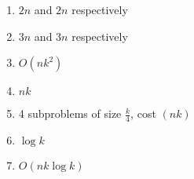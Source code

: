 \documentclass[11pt]{article}
\begin{document}
\begin{enumerate}
    \item $2n$ and $2n$ respectively
    \item $3n$ and $3n$ respectively
    \item $O(nk^2)$
    \item $nk$
    \item 4 subproblems of size $\frac{k}{4}$, cost $(nk)$
    \item $\log{k}$
    \item $O(nk \log{k})$
\end{enumerate}
\end{document}
